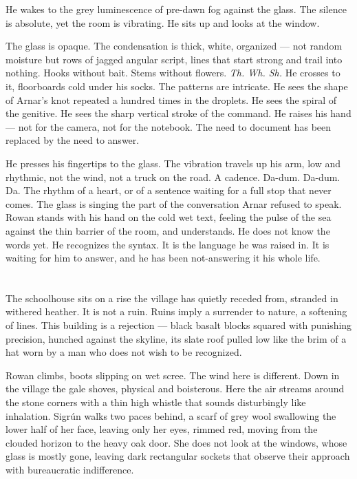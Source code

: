 \documentclass[11pt,oneside]{book}
\begin{document}
He wakes to the grey luminescence of pre-dawn fog against the glass. The
silence is absolute, yet the room is vibrating. He sits up and looks at
the window.

The glass is opaque. The condensation is thick, white, organized --- not
random moisture but rows of jagged angular script, lines that start
strong and trail into nothing. Hooks without bait. Stems without
flowers. \emph{Th. Wh. Sh.} He crosses to it, floorboards cold under his
socks. The patterns are intricate. He sees the shape of Arnar's knot
repeated a hundred times in the droplets. He sees the spiral of the
genitive. He sees the sharp vertical stroke of the command. He raises
his hand --- not for the camera, not for the notebook. The need to
document has been replaced by the need to answer.

He presses his fingertips to the glass. The vibration travels up his
arm, low and rhythmic, not the wind, not a truck on the road. A cadence.
Da-dum. Da-dum. Da. The rhythm of a heart, or of a sentence waiting for
a full stop that never comes. The glass is singing the part of the
conversation Arnar refused to speak. Rowan stands with his hand on the
cold wet text, feeling the pulse of the sea against the thin barrier of
the room, and understands. He does not know the words yet. He recognizes
the syntax. It is the language he was raised in. It is waiting for him
to answer, and he has been not-answering it his whole life.

\chapter{}

The schoolhouse sits on a rise the village has quietly receded from,
stranded in withered heather. It is not a ruin. Ruins imply a surrender
to nature, a softening of lines. This building is a rejection --- black
basalt blocks squared with punishing precision, hunched against the
skyline, its slate roof pulled low like the brim of a hat worn by a man
who does not wish to be recognized.

Rowan climbs, boots slipping on wet scree. The wind here is different.
Down in the village the gale shoves, physical and boisterous. Here the
air streams around the stone corners with a thin high whistle that
sounds disturbingly like inhalation. Sigrún walks two paces behind, a
scarf of grey wool swallowing the lower half of her face, leaving only
her eyes, rimmed red, moving from the clouded horizon to the heavy oak
door. She does not look at the windows, whose glass is mostly gone,
leaving dark rectangular sockets that observe their approach with
bureaucratic indifference.
\end{document}

